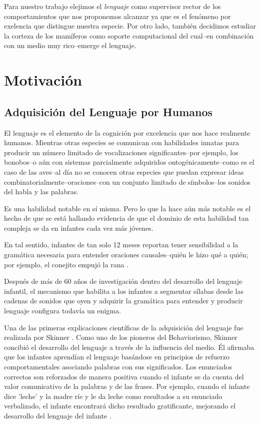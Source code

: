 Para nuestro trabajo elejimos el \emph{lenguaje} como supervisor rector de los comportamientos que nos proponemos alcanzar ya que es el fenómeno por exelencia que distingue nuestra especie. Por otro lado, también decidimos estudiar la corteza de los mamíferos como soporte computacional del cual--en combinación con un medio muy rico--emerge el lenguaje.


\section{Motivación}

\subsection{Adquisición del Lenguaje por Humanos}

El lenguaje es el elemento de la cognición por excelencia que nos hace realmente humanos.
Mientras otras especies se comunican con habilidades innatas para producir un número limitado de vocalizaciones significantes--por ejemplo, los bonobos--o aún con sistemas parcialmente adquiridos ontogénicamente--como es el caso de las aves--al día no se conocen otras especies que puedan expresar ideas combinatorialmente--oraciones--con un conjunto limitado de símbolos--los sonidos del habla y las palabras.

Es una habilidad notable en sí misma. Pero lo que la hace aún más notable es el hecho de que se está hallando evidencia de que el dominio de esta habilidad tan compleja se da en infantes cada vez más jóvenes.

En tal sentido, infantes de tan solo 12 meses reportan tener sensibilidad a la gramática necesaria para entender oraciones causales--quién le hizo qué a quién; por ejemplo, el conejito empujó la rana \cite{doi:10.1080/15475441003769411}.

Después de más de 60 años de investigación dentro del desarrollo del lenguaje infantil, el mecanismo que habilita a los infantes a segmentar sílabas desde las cadenas de sonidos que oyen y adquirir la gramática para entender y producir lenguaje configura todavía un enigma.

Una de las primeras explicaciones científicas de la adquisición del lenguaje fue realizada por Skinner \cite{skinner1957verbal}.
Como uno de los pioneros del Behaviorismo, Skinner concibió el desarrollo del lenguaje a través de la influencia del medio.
Él afirmaba que los infantes aprendían el lenguaje basándose en principios de refuerzo comportamentales asociando palabras con sus significados.
Los enunciados correctos son reforzados de manera positiva cuando el infante se da cuenta del valor comunicativo de la palabras y de las frases.
Por ejemplo, cuando el infante dice 'leche' y la madre ríe y le da leche como resultados a su enunciado verbalizado, el infante encontrará dicho resultado gratificante, mejorando el desarrollo del lenguaje del infante \cite{doi:10.1111/j.1460-6984.2011.00086.x}. 

